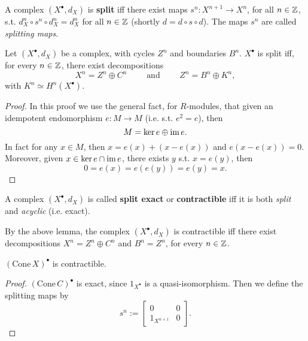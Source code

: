 \begin{defn}
	A complex $\left( X^{\bullet}, d_{X} \right)$ is \textbf{split} iff there exist
	maps $s^n: X^{n+1} \to X^n$, for all $n \in \mathbb{Z}$, s.t.
	$d^n_X \circ s^n \circ d^n_X = d^n_X$ for all $n \in \mathbb{Z}$ (shortly $d = d \circ s \circ d$).
	The maps $s^n$ are called \textit{splitting maps}.
\end{defn}

\begin{lem}
	Let $\left( X^{\bullet}, d_{X} \right)$ be a complex, with cycles $Z^n$ and
	boundaries $B^n$.
	$X^\bullet$ is split iff, for every $n \in \mathbb{Z}$, there
	exist decompositions
	\begin{equation}
	X^n = Z^n \oplus C^n \qquad \text{ and } \qquad
	Z^n = B^n \oplus K^n
	,\end{equation} 
	with $K^n \simeq H^n(X^\bullet)$.
\end{lem} 
\begin{proof}
	In this proof we use the general fact, for $R$-modules, that given an idempotent
	endomorphism $e: M \to M$ (i.e. s.t. $e^2 = e$), then
	\begin{equation}
	M = \ker e \oplus \operatorname{im} e
	.\end{equation} 
	In fact for any $x \in M$, then $x = e(x) + (x - e(x))$ and
	$e(x - e(x)) = 0$.
	Moreover, given $x \in \ker e \cap \operatorname{im} e$, there exists $y$ s.t. $x = e(y)$, then
	\begin{equation}
		0 = e(x) = e(e(y)) = e(y) = x
	.\end{equation} 
\end{proof}

\begin{defn}
	A complex $\left( X^{\bullet}, d_{X} \right)$ is called \textbf{split exact} or \textbf{contractible} iff
	it is both \textit{split} and \textit{acyclic} (i.e. exact).
\end{defn}

\begin{rem}[]
	By the above lemma, the complex $\left( X^{\bullet}, d_{X} \right)$ is contractible iff
	there exist decompositions $X^n = Z^n \oplus C^n$ and $B^n = Z^n$, for every $n \in \mathbb{Z}$.
\end{rem}

\begin{lem}
	$(\mathrm{Cone}\, X)^\bullet$ is contractible.
\end{lem} 
\begin{proof}
	$\left( \mathrm{Cone}\, C \right)^\bullet$ is exact, since $1_{X^\bullet}$ is a quasi-isomorphism.
	Then we define the splitting maps by
	\begin{equation}
	s^n :=
	\begin{bmatrix}
		0 & 0\\
		1_{X^{n+1}} & 0
	\end{bmatrix} 
	.\end{equation} 
\end{proof}


